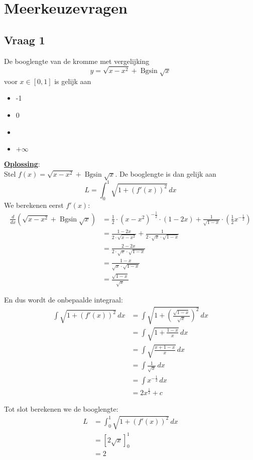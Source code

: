 \documentclass[kulak]{kulakarticle} %
\DeclareMathOperator{\Bgsin}{Bgsin}
\renewcommand{\boxed}[1]{\text{\fboxsep=.3em\fbox{#1}}}
\begin{document}
	\section*{Meerkeuzevragen}

	\subsection*{Vraag 1}

	De booglengte van de kromme met vergelijking \[ y=\sqrt{x-x^2} + \Bgsin \sqrt{x} \] voor \(x\in[0,1]\) is gelijk aan
	\begin{itemize}
		\item -1
		\item 0
		\item \boxed{2}
		\item \(+\infty\)
	\end{itemize}

	\textbf{\underline{Oplossing}}: \\

	Stel \(f(x)=\sqrt{x-x^2} + \Bgsin \sqrt{x}\). De booglengte is dan gelijk aan \[L=\int_0^1 \sqrt{1+(f'(x))^2} \, dx\]
	We berekenen eerst \(f'(x)\):
	\begin{align*}
		\frac{d}{dx}\left(\sqrt{x-x^2} + \Bgsin \sqrt{x}\right)
		&= \frac{1}{2}\cdot(x-x^2)^{-\frac{1}{2}}\cdot(1-2x)+\frac{1}{\sqrt{1-x}}\cdot \left(\frac{1}{2}x^{-\frac{1}{2}}\right) \\
		&= \frac{1-2x}{2\cdot \sqrt{x-x^2}} + \frac{1}{2\cdot \sqrt{x}\cdot \sqrt{1-x}} \\
		&= \frac{2-2x}{2\cdot \sqrt{x}\cdot \sqrt{1-x}} \\
		&= \frac{1-x}{\sqrt{x}\cdot \sqrt{1-x}} \\
		&= \frac{\sqrt{1-x}}{\sqrt{x}}
	\end{align*}

	En dus wordt de onbepaalde integraal:
	\begin{align*}
		\int \sqrt{1+(f'(x))^2} \, dx
		&= \int \sqrt{1+\left(\frac{\sqrt{1-x}}{\sqrt{x}}\right)^2} \, dx \\
		&= \int \sqrt{1+\frac{1-x}{x}} \, dx \\
		&= \int \sqrt{\frac{x+1-x}{x}} \, dx \\
		&= \int \frac{1}{\sqrt{x}} \, dx \\
		&= \int x^{-\frac{1}{2}} \, dx \\
		&= 2x^{\frac{1}{2}} + c
	\end{align*}

	Tot slot berekenen we de booglengte:
	\begin{align*}
		L&=\int_0^1 \sqrt{1+(f'(x))^2} \, dx\\
		&= \left[2\sqrt{x}\right]^1_0\\
		&= 2
	\end{align*}
\end{document}

